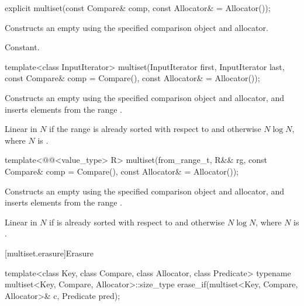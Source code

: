 %
\begin{itemdecl}
explicit multiset(const Compare& comp, const Allocator& = Allocator());
\end{itemdecl}

\begin{itemdescr}
\pnum
\effects
Constructs an empty  using the specified comparison object and allocator.

\pnum
\complexity
Constant.
\end{itemdescr}

%
\begin{itemdecl}
template<class InputIterator>
  multiset(InputIterator first, InputIterator last,
           const Compare& comp = Compare(), const Allocator& = Allocator());
\end{itemdecl}

\begin{itemdescr}
\pnum
\effects
Constructs an empty
using the specified comparison object and allocator,
and inserts elements from the range
.

\pnum
\complexity
Linear in $N$
if the range
is already sorted with respect to  and otherwise $N \log N$,
where $N$ is
.
\end{itemdescr}

%
\begin{itemdecl}
template<@@<value_type> R>
  multiset(from_range_t, R&& rg, const Compare& comp = Compare(), const Allocator& = Allocator());
\end{itemdecl}

\begin{itemdescr}
\pnum
\effects
Constructs an empty 
using the specified comparison object and allocator, and
inserts elements from the range .

\pnum
\complexity
Linear in $N$ if  is already sorted with respect to  and
otherwise $N \log N$, where $N$ is .
\end{itemdescr}

[multiset.erasure]{Erasure}

%
\begin{itemdecl}
template<class Key, class Compare, class Allocator, class Predicate>
  typename multiset<Key, Compare, Allocator>::size_type
    erase_if(multiset<Key, Compare, Allocator>& c, Predicate pred);
\end{itemdecl}

